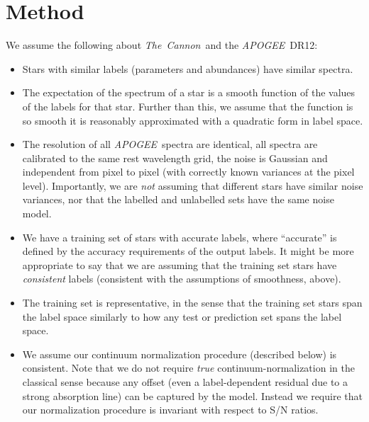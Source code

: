 \documentclass[12pt,preprint]{aastex}
\newcommand{\project}[1]{\textsl{#1}}
\newcommand{\TheCannon}{\project{The~Cannon}}
\newcommand{\acronym}[1]{{\small{#1}}}
\newcommand{\apogee}{\project{\acronym{APOGEE}}}
\newcommand{\dr}{\acronym{DR12}}
\begin{document}
\section{Method}

\noindent{}We assume the following about \TheCannon\ and the \apogee\ \dr:
\begin{itemize}
\item
Stars with similar labels (parameters and abundances) have similar spectra.
\item
The expectation of the spectrum of a star is a smooth function of the values of 
the labels for that star.  Further than this, we assume that the function is so 
smooth it is reasonably approximated with a quadratic form in label space.
\item
The resolution of all \apogee\ spectra are identical, all spectra are calibrated
to the same rest wavelength grid, the noise is Gaussian and independent from 
pixel to pixel (with correctly known variances at the pixel level).  
Importantly, we are \emph{not} assuming that different stars have similar noise
variances, nor that the labelled and unlabelled sets have the same noise model.
\item
We have a training set of stars with accurate labels, where ``accurate'' is 
defined by the accuracy requirements of the output labels.  It might be more 
appropriate to say that we are assuming that the training set stars have 
\emph{consistent} labels (consistent with the assumptions of smoothness, above).
\item
The training set is representative, in the sense that the training set stars 
span the label space similarly to how any test or prediction set spans the label
space.
\item
We assume our continuum normalization procedure (described below) is consistent.
Note that we do not require \emph{true} continuum-normalization in the classical
sense because any offset (even a label-dependent residual due to a strong 
absorption line) can be captured by the model.  Instead we require that our 
normalization procedure is invariant with respect to S/N ratios.
\end{itemize}
\end{document}
